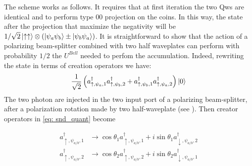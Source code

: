 \documentclass[
aps, pra, authorblock, superscriptaddress, twocolumn,
	10pt]{revtex4-1}
\begin{document}
The scheme works as follows. It requires that at first iteration the two Qws are identical and to perform type 00 projection on the coins. In this way, the state after the projection that maximize the negativity will be $1/\sqrt{2}\ket{\uparrow \uparrow}\otimes(\ket{\psi_a\psi_b}\pm\ket{\psi_b\psi_a})$. 
It is straightforward to show that the action of a polarizing beam-splitter combined with two half waveplates can perform with probability $1/2$ the $U^{Bell}$ needed to perfom the accumulation.
Indeed, rewriting the state in terms of creation operators we have:
\begin{equation}
    \frac{1}{\sqrt{2}}\left(a^{\dagger}_{\uparrow, \psi_a,1}a^{\dagger}_{\uparrow, \psi_b,2}+a^{\dagger}_{\uparrow, \psi_b,1}a^{\dagger}_{\uparrow, \psi_a,2} \right)\ket{0} 
    \label{eq: snd_quant}
\end{equation}
The two photon are injected in the two input port of a polarizing beam-splitter, after a polarization rotation made by two half-waveplate (see ). Then creator operators in \cref{eq: snd_quant} become

\begin{equation}\begin{aligned}
    a^{\dagger}_{\uparrow, \psi_{a/b},1} & \rightarrow \cos{\theta_1}a^{\dagger}_{\uparrow, \psi_{a/b},1} + i\sin{\theta_1}a^{\dagger}_{\downarrow, \psi_{a/b},2} \\
    a^{\dagger}_{\uparrow, \psi_{a/b},2} & \rightarrow \cos{\theta_2}a^{\dagger}_{\uparrow, \psi_{a/b},2} + i\sin{\theta_2}a^{\dagger}_{\downarrow, \psi_{a/b},1}
\end{aligned}\end{equation}
\end{document}
